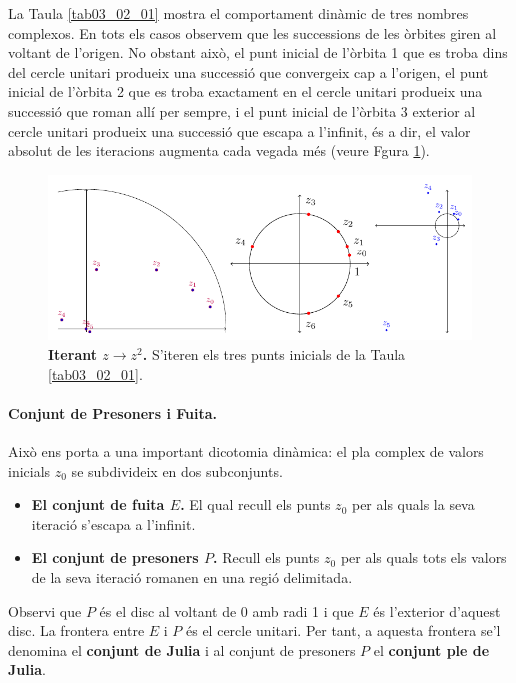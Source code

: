 \documentclass[12pt,a4paper]{report}
\begin{document}
La Taula \ref{tab03_02_01} mostra el comportament dinàmic de tres nombres complexos. En tots els casos observem que les successions de les òrbites giren al voltant de l'origen. No obstant això, el punt inicial de l'òrbita 1 que es troba dins del cercle unitari produeix una successió que convergeix cap a l'origen, el punt inicial de l'òrbita 2 que es troba exactament en el cercle unitari produeix una successió que roman allí per sempre, i el punt inicial de l'òrbita 3 exterior al cercle unitari produeix una successió que escapa a l'infinit, és a dir, el valor absolut de les iteracions augmenta cada vegada més (veure Fgura \ref{img03_01}). 

\begin{figure}[!ht]
\centering
\includegraphics[scale=1]{img/img03_01_prisioners.pdf}
\caption{\textbf{Iterant $z \rightarrow z^{2}$.} S'iteren els tres punts inicials de la Taula \ref{tab03_02_01}.}
\label{img03_01}
\end{figure}

\paragraph*{Conjunt de Presoners i Fuita.}
Això ens porta a una important dicotomia dinàmica: el pla complex de valors inicials $z_0$ se subdivideix en dos subconjunts.
\begin{itemize}
\item \textbf{El conjunt de fuita $E$.} El qual recull els punts $z_0$ per als quals la seva iteració s'escapa a l'infinit.
\item \textbf{El conjunt de presoners $P$.} Recull els punts $z_0$ per als quals tots els valors de la seva iteració romanen en una regió delimitada.
\end{itemize}
Observi que $P$ és el disc al voltant de 0 amb radi 1 i que $E$ és l'exterior d'aquest disc. La frontera entre $E$ i $P$ és el cercle unitari. Per tant, a aquesta frontera se'l denomina el \textbf{conjunt de Julia} i al conjunt de presoners $P$ el \textbf{conjunt ple de Julia}.
\end{document}
